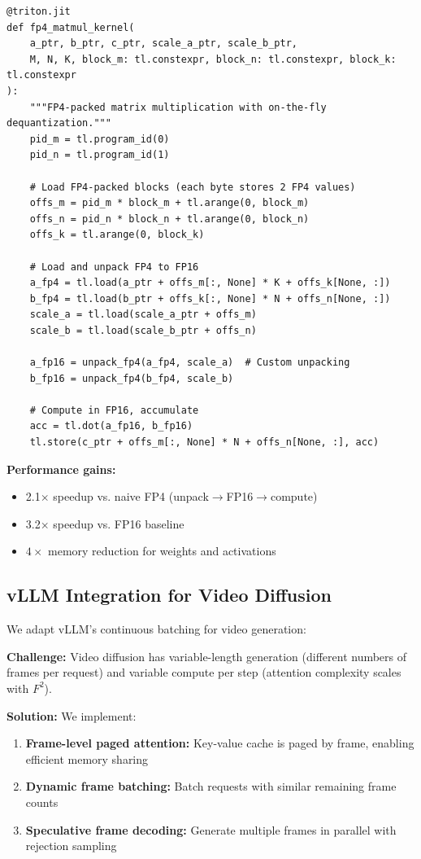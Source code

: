 \documentclass[journal]{IEEEtran}
\theoremstyle{definition}
\theoremstyle{remark}
\begin{document}
\begin{lstlisting}[caption={FP4-Packed Triton Matrix Multiplication Kernel}, label={lst:triton_matmul}]
@triton.jit
def fp4_matmul_kernel(
    a_ptr, b_ptr, c_ptr, scale_a_ptr, scale_b_ptr,
    M, N, K, block_m: tl.constexpr, block_n: tl.constexpr, block_k: tl.constexpr
):
    """FP4-packed matrix multiplication with on-the-fly dequantization."""
    pid_m = tl.program_id(0)
    pid_n = tl.program_id(1)
    
    # Load FP4-packed blocks (each byte stores 2 FP4 values)
    offs_m = pid_m * block_m + tl.arange(0, block_m)
    offs_n = pid_n * block_n + tl.arange(0, block_n)
    offs_k = tl.arange(0, block_k)
    
    # Load and unpack FP4 to FP16
    a_fp4 = tl.load(a_ptr + offs_m[:, None] * K + offs_k[None, :])
    b_fp4 = tl.load(b_ptr + offs_k[:, None] * N + offs_n[None, :])
    scale_a = tl.load(scale_a_ptr + offs_m)
    scale_b = tl.load(scale_b_ptr + offs_n)
    
    a_fp16 = unpack_fp4(a_fp4, scale_a)  # Custom unpacking
    b_fp16 = unpack_fp4(b_fp4, scale_b)
    
    # Compute in FP16, accumulate
    acc = tl.dot(a_fp16, b_fp16)
    tl.store(c_ptr + offs_m[:, None] * N + offs_n[None, :], acc)
\end{lstlisting}

\textbf{Performance gains:}
\begin{itemize}
    \item 2.1$\times$ speedup vs. naive FP4 (unpack$\rightarrow$FP16$\rightarrow$compute)
    \item 3.2$\times$ speedup vs. FP16 baseline
    \item $4\times$ memory reduction for weights and activations
\end{itemize}

\subsection{vLLM Integration for Video Diffusion}

We adapt vLLM's continuous batching for video generation:

\textbf{Challenge:} Video diffusion has variable-length generation (different numbers of frames per request) and variable compute per step (attention complexity scales with $F^2$).

\textbf{Solution:} We implement:
\begin{enumerate}
    \item \textbf{Frame-level paged attention:} Key-value cache is paged by frame, enabling efficient memory sharing
    \item \textbf{Dynamic frame batching:} Batch requests with similar remaining frame counts
    \item \textbf{Speculative frame decoding:} Generate multiple frames in parallel with rejection sampling
\end{enumerate}
\end{document}
